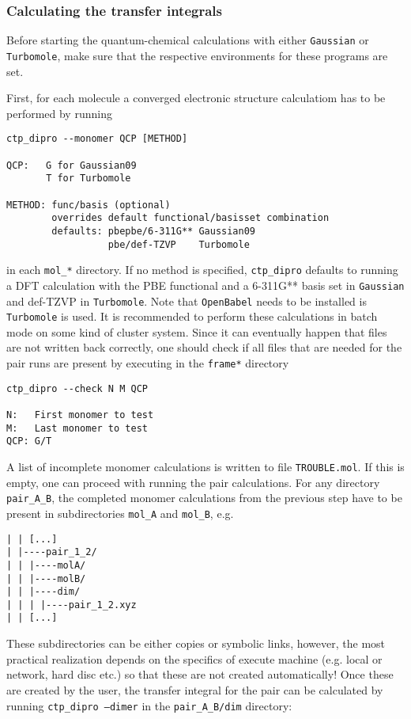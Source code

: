 \subsubsection{Calculating the transfer integrals}
Before starting the quantum-chemical calculations with either {\tt Gaussian} or {\tt Turbomole}, make sure that the respective environments for these programs are set. 

First, for each molecule a converged electronic structure calculatiom has to be performed by running 
\begin{verbatim}
ctp_dipro --monomer QCP [METHOD]

QCP:   G for Gaussian09
       T for Turbomole

METHOD: func/basis (optional)
        overrides default functional/basisset combination
        defaults: pbepbe/6-311G** Gaussian09
                  pbe/def-TZVP    Turbomole
\end{verbatim}
in each {\tt mol\_*} directory. If no method is specified, {\tt ctp\_dipro} defaults to running a DFT calculation with the PBE functional and a 6-311G** basis set in {\tt Gaussian} and def-TZVP in {\tt Turbomole}. Note that {\tt OpenBabel} needs to be installed is {\tt Turbomole} is used. It is recommended to perform these calculations in batch mode on some kind of cluster system. Since it can eventually happen that files are not written back correctly, one should check if all files that are needed for the pair runs are present by executing in the {\tt frame*} directory
\begin{verbatim}
ctp_dipro --check N M QCP

N:   First monomer to test
M:   Last monomer to test
QCP: G/T 
\end{verbatim}
A list of incomplete monomer calculations is written to file {\tt TROUBLE.mol}. If this is empty, one can proceed with running the pair calculations. For any directory {\tt pair\_A\_B}, the completed monomer calculations from the previous step have to be present in subdirectories {\tt mol\_A} and {\tt mol\_B}, e.g.
\begin{verbatim}
| | [...]
| |----pair_1_2/
| | |----molA/
| | |----molB/
| | |----dim/
| | | |----pair_1_2.xyz
| | [...]
\end{verbatim}
These subdirectories can be either copies or symbolic links, however, the most practical realization depends on the specifics of execute machine (e.g. local or network, hard disc etc.) so that these are not created automatically! Once these are created by the user, the transfer integral for the pair can be calculated by running {\tt ctp\_dipro --dimer} in the {\tt pair\_A\_B/dim} directory:
